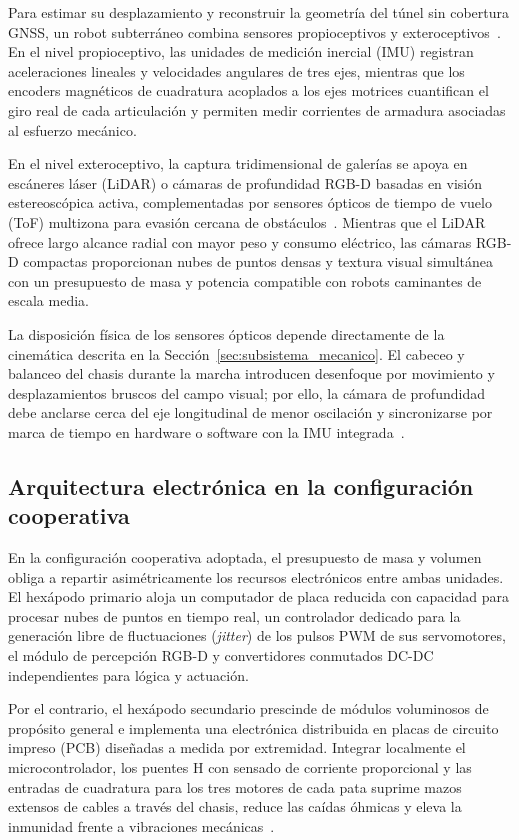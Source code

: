 Para estimar su desplazamiento y reconstruir la geometría del túnel sin cobertura GNSS, un robot subterráneo combina sensores propioceptivos y exteroceptivos~\cite{thrun2005probabilistic, cadena2016past}. En el nivel propioceptivo, las unidades de medición inercial (IMU) registran aceleraciones lineales y velocidades angulares de tres ejes, mientras que los encoders magnéticos de cuadratura acoplados a los ejes motrices cuantifican el giro real de cada articulación y permiten medir corrientes de armadura asociadas al esfuerzo mecánico.

En el nivel exteroceptivo, la captura tridimensional de galerías se apoya en escáneres láser (LiDAR) o cámaras de profundidad RGB-D basadas en visión estereoscópica activa, complementadas por sensores ópticos de tiempo de vuelo (ToF) multizona para evasión cercana de obstáculos~\cite{KimChoi_2025_MineMapping}. Mientras que el LiDAR ofrece largo alcance radial con mayor peso y consumo eléctrico, las cámaras RGB-D compactas proporcionan nubes de puntos densas y textura visual simultánea con un presupuesto de masa y potencia compatible con robots caminantes de escala media.

La disposición física de los sensores ópticos depende directamente de la cinemática descrita en la Sección~\ref{sec:subsistema_mecanico}. El cabeceo y balanceo del chasis durante la marcha introducen desenfoque por movimiento y desplazamientos bruscos del campo visual; por ello, la cámara de profundidad debe anclarse cerca del eje longitudinal de menor oscilación y sincronizarse por marca de tiempo en hardware o software con la IMU integrada~\cite{cadena2016past, KimChoi_2025_MineMapping}.

\subsection{Arquitectura electrónica en la configuración cooperativa}

En la configuración cooperativa adoptada, el presupuesto de masa y volumen obliga a repartir asimétricamente los recursos electrónicos entre ambas unidades. El hexápodo primario aloja un computador de placa reducida con capacidad para procesar nubes de puntos en tiempo real, un controlador dedicado para la generación libre de fluctuaciones (\textit{jitter}) de los pulsos PWM de sus servomotores, el módulo de percepción RGB-D y convertidores conmutados DC-DC independientes para lógica y actuación.

Por el contrario, el hexápodo secundario prescinde de módulos voluminosos de propósito general e implementa una electrónica distribuida en placas de circuito impreso (PCB) diseñadas a medida por extremidad. Integrar localmente el microcontrolador, los puentes H con sensado de corriente proporcional y las entradas de cuadratura para los tres motores de cada pata suprime mazos extensos de cables a través del chasis, reduce las caídas óhmicas y eleva la inmunidad frente a vibraciones mecánicas~\cite{AdvancesMining_2023}.

